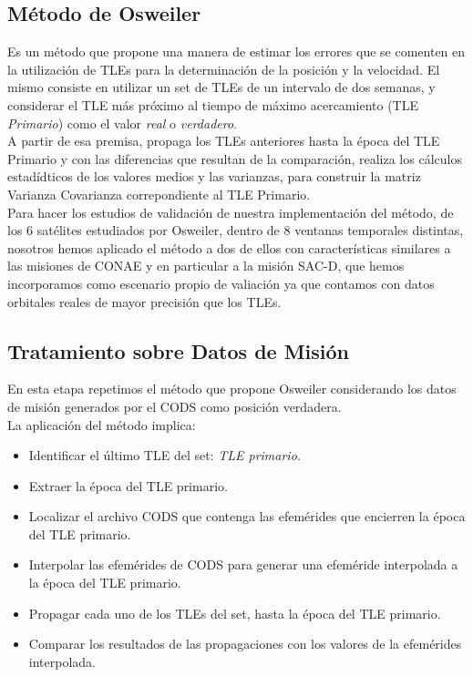 \subsection{M\'etodo de Osweiler}
Es un m\'etodo que propone una manera de estimar los errores que se comenten en la utilizaci\'on de TLEs para la determinaci\'on de la posici\'on y la velocidad.
 El mismo consiste en utilizar un set de TLEs de un intervalo de dos semanas, y considerar el TLE m\'as pr\'oximo al tiempo de m\'aximo acercamiento (TLE  {\it{Primario}}) como el valor {\it{real}} o {\it{verdadero}}.\\
 A partir de esa premisa, propaga los TLEs anteriores hasta la \'epoca del TLE Primario y con las diferencias que resultan de la comparaci\'on, realiza los c\'alculos estad\'idticos de los valores medios y las varianzas, para construir la matriz Varianza Covarianza correpondiente al TLE Primario.\\
 Para hacer los estudios de validaci\'on de nuestra implementaci\'on del m\'etodo, de los 6 sat\'elites estudiados por Osweiler, dentro de 8 ventanas temporales distintas, nosotros hemos aplicado el m\'etodo a dos de ellos con caracter\'isticas similares a las misiones de CONAE y en particular a la misi\'on SAC-D, que hemos incorporamos como escenario propio de valiaci\'on ya que contamos con datos orbitales reales de mayor precisi\'on que los TLEs.

\subsection{Tratamiento sobre Datos de Misi\'on}
En esta etapa repetimos el m\'etodo que propone Osweiler considerando los datos de misi\'on generados por el CODS
como posici\'on verdadera.\\
La aplicaci\'on del m\'etodo implica:
\begin{itemize}
 \item Identificar el \'ultimo TLE del set: {\it{TLE primario.}}
 \item Extraer la \'epoca del TLE primario.
 \item Localizar el archivo CODS que contenga las efem\'erides que encierren la \'epoca del TLE primario.
 \item Interpolar las efem\'erides de CODS para generar una efem\'eride interpolada a la \'epoca del TLE primario.
 \item Propagar cada uno de los TLEs del set, hasta la \'epoca del TLE primario.
 \item Comparar los resultados de las propagaciones con los valores de la efem\'erides interpolada.
\end{itemize}

